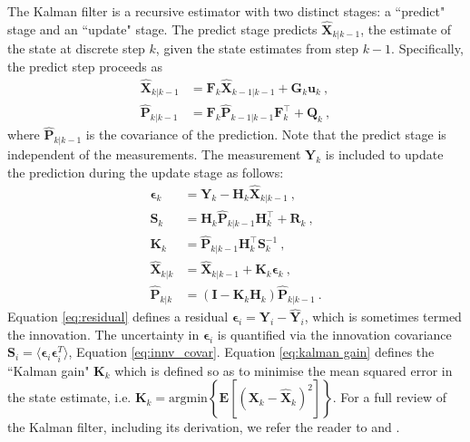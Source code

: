 \documentclass[fleqn,usenatbib,useAMS]{mnras}
\begin{document}
The Kalman filter is a recursive estimator with two distinct stages: a ``predict" stage and an ``update" stage. The predict stage predicts $\hat{\boldsymbol{X}}_{k|k-1}$, the estimate of the state at discrete step $k$, given the state estimates from step $k-1$. Specifically, the predict step proceeds as
\begin{align}
	\hat{\boldsymbol{X}}_{k|k-1} &=  \boldsymbol{F}_k \hat{\boldsymbol{X}}_{k-1|k-1} + \boldsymbol{G}_k \boldsymbol{u}_k \ , \\
	\hat{\boldsymbol{P}}_{k|k-1} &=  \boldsymbol{F}_k \hat{\boldsymbol{P}}_{k-1|k-1} \boldsymbol{F}_k^\intercal + \boldsymbol{Q}_k  \ ,
\end{align}
where $\hat{\boldsymbol{P}}_{k|k-1}$ is the covariance of the prediction. Note that the predict stage is independent of the measurements. The measurement $\boldsymbol{Y}_k$ is included to update the prediction during the update stage as follows:
\begin{align}
	\boldsymbol{\epsilon}_{k} &= \boldsymbol{Y}_k - \boldsymbol{H}_k \hat{\boldsymbol{X}}_{k|k-1} \ , \label{eq:residual} \\
	\boldsymbol{S}_k &= \boldsymbol{H}_k \hat{\boldsymbol{P}}_{k|k-1} \boldsymbol{H}_k^\intercal + \boldsymbol{R}_k \ , \label{eq:innv_covar}\\
	\boldsymbol{K}_k &= \hat{\boldsymbol{P}}_{k|k-1} \boldsymbol{H}_k^\intercal \boldsymbol{S}_k^{-1} \ ,\label{eq:kalman gain} \\
	\hat{\boldsymbol{X}}_{k|k} &=\hat{\boldsymbol{X}}_{k|k-1} +\boldsymbol{K}_k  \boldsymbol{\epsilon}_{k}  \ , \label{eq:kalmangainupdate} \\
	\hat{\boldsymbol{P}}_{k|k} &= \left( \boldsymbol{I} - \boldsymbol{K}_k \boldsymbol{H}_k \right) 	\hat{\boldsymbol{P}}_{k|k-1} \ .
\end{align}
Equation \eqref{eq:residual} defines a residual $\boldsymbol{\epsilon}_i = \boldsymbol{Y}_i  - \hat{\boldsymbol{Y}}_i$, which is sometimes termed the innovation. The uncertainty in $\boldsymbol{\epsilon}_i$ is quantified via the innovation covariance $\boldsymbol{S}_i = \langle \boldsymbol{\epsilon}_i \boldsymbol{\epsilon}_i^{T} \rangle$, Equation \eqref{eq:innv_covar}. Equation \eqref{eq:kalman gain} defines the ``Kalman gain" $\boldsymbol{K}_k$ which is defined so as to minimise the mean squared error in the state estimate, i.e.  $\boldsymbol{K}_k = \text{argmin} \left \{ \boldsymbol{E}[ (\boldsymbol{X}_k - \hat{\boldsymbol{X}}_k)^2 ] \right \}$. For a full review of the Kalman filter, including its derivation, we refer the reader to \cite{Gelb:1974} and \cite{zarchan2000fundamentals}. \newline 
\end{document}
